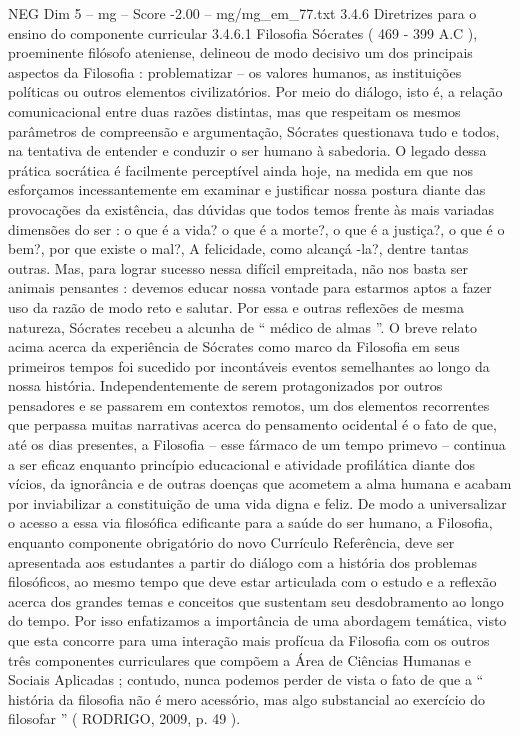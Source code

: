\begin{textsample}{NEG Dim 5 – mg – Score -2.00 – mg/mg\_em\_77.txt}  \label{ex:f5_neg_101}
3.4.6 Diretrizes para o ensino do componente curricular 3.4.6.1 Filosofia Sócrates ( 469 - 399 A.C ), proeminente filósofo ateniense, delineou de modo decisivo um dos principais aspectos da Filosofia : problematizar – os valores humanos, as instituições políticas ou outros elementos civilizatórios.
Por meio do diálogo, isto é, a relação comunicacional entre duas razões distintas, mas que respeitam os mesmos parâmetros de compreensão e argumentação, Sócrates questionava tudo e todos, na tentativa de entender e conduzir o ser humano à sabedoria.
O legado dessa prática socrática é facilmente perceptível ainda hoje, na medida em que nos esforçamos incessantemente em examinar e justificar nossa postura diante das provocações da existência, das dúvidas que todos temos frente às mais variadas dimensões do ser : o que é a vida? o que é a morte?, o que é a justiça?, o que é o bem?, por que existe o mal?, A felicidade, como alcançá -la?, dentre tantas outras.
Mas, para lograr sucesso nessa difícil empreitada, não nos basta ser animais pensantes : devemos educar nossa vontade para estarmos aptos a fazer uso da razão de modo reto e salutar.
Por essa e outras reflexões de mesma natureza, Sócrates recebeu a alcunha de “ médico de almas ”.
O breve relato acima acerca da experiência de Sócrates como marco da Filosofia em seus primeiros tempos foi sucedido por incontáveis eventos semelhantes ao longo da nossa história.
Independentemente de serem protagonizados por outros pensadores e se passarem em contextos remotos, um dos elementos recorrentes que perpassa muitas narrativas acerca do pensamento ocidental é o fato de que, até os dias presentes, a Filosofia – esse fármaco de um tempo primevo – continua a ser eficaz enquanto princípio educacional e atividade profilática diante dos vícios, da ignorância e de outras doenças que acometem a alma humana e acabam por inviabilizar a constituição de uma vida digna e feliz.
De modo a universalizar o acesso a essa via filosófica edificante para a saúde do ser humano, a Filosofia, enquanto componente obrigatório do novo Currículo Referência, deve ser apresentada aos estudantes a partir do diálogo com a história dos problemas filosóficos, ao mesmo tempo que deve estar articulada com o estudo e a reflexão acerca dos grandes temas e conceitos que sustentam seu desdobramento ao longo do tempo.
Por isso enfatizamos a importância de uma abordagem temática, visto que esta concorre para uma interação mais profícua da Filosofia com os outros três componentes curriculares que compõem a Área de Ciências Humanas e Sociais Aplicadas ; contudo, nunca podemos perder de vista o fato de que a “ história da filosofia não é mero acessório, mas algo substancial ao exercício do filosofar ” ( RODRIGO, 2009, p. 49 ).

\end{textsample}
